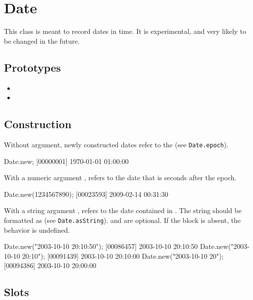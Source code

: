\section{Date}

This class is meant to record dates in time.  It is experimental, and
very likely to be changed in the future.

\subsection{Prototypes}
\begin{itemize}
\item {}
\item {}
\end{itemize}

\subsection{Construction}

Without argument, newly constructed dates refer to the 
(see \lstinline|Date.epoch|).

\begin{urbiscript}
Date.new;
[00000001] 1970-01-01 01:00:00
\end{urbiscript}

With a numeric argument , refers to the date that is 
seconds after the epoch.

\begin{urbiscript}[firstnumber=last]
Date.new(1234567890);
[00023593] 2009-02-14 00:31:30
\end{urbiscript}

With a string argument , refers to the date contained in .
The string should be formatted as  (see \lstinline|Date.asString|). 
and  are optional. If the block 
is absent, the behavior is undefined.


\begin{urbiscript}[firstnumber=last]
Date.new("2003-10-10 20:10:50");
[00086457] 2003-10-10 20:10:50
Date.new("2003-10-10 20:10");
[00091439] 2003-10-10 20:10:00
Date.new("2003-10-10 20");
[00094386] 2003-10-10 20:00:00
\end{urbiscript}

\subsection{Slots}

